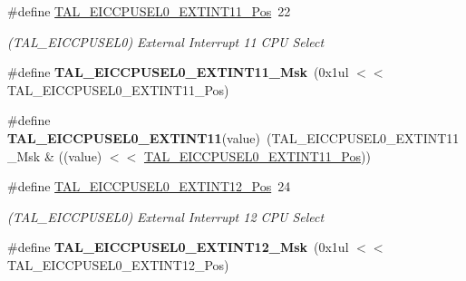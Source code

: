 \begin{DoxyCompactItemize}
\item 
\hypertarget{group___s_a_m_l21___t_a_l_ga1a308295007cbd0a12cda84afcc9bdfa}{}\#define \hyperlink{group___s_a_m_l21___t_a_l_ga1a308295007cbd0a12cda84afcc9bdfa}{T\+A\+L\+\_\+\+E\+I\+C\+C\+P\+U\+S\+E\+L0\+\_\+\+E\+X\+T\+I\+N\+T11\+\_\+\+Pos}~22\label{group___s_a_m_l21___t_a_l_ga1a308295007cbd0a12cda84afcc9bdfa}

\begin{DoxyCompactList}\small\item\em (T\+A\+L\+\_\+\+E\+I\+C\+C\+P\+U\+S\+E\+L0) External Interrupt 11 C\+P\+U Select \end{DoxyCompactList}\item 
\hypertarget{group___s_a_m_l21___t_a_l_ga5fe5659e7fb5db0aa3148a15c0838002}{}\#define {\bfseries T\+A\+L\+\_\+\+E\+I\+C\+C\+P\+U\+S\+E\+L0\+\_\+\+E\+X\+T\+I\+N\+T11\+\_\+\+Msk}~(0x1ul $<$$<$ T\+A\+L\+\_\+\+E\+I\+C\+C\+P\+U\+S\+E\+L0\+\_\+\+E\+X\+T\+I\+N\+T11\+\_\+\+Pos)\label{group___s_a_m_l21___t_a_l_ga5fe5659e7fb5db0aa3148a15c0838002}

\item 
\hypertarget{group___s_a_m_l21___t_a_l_ga52f5a93be9058a45eec060ce126e8168}{}\#define {\bfseries T\+A\+L\+\_\+\+E\+I\+C\+C\+P\+U\+S\+E\+L0\+\_\+\+E\+X\+T\+I\+N\+T11}(value)~(T\+A\+L\+\_\+\+E\+I\+C\+C\+P\+U\+S\+E\+L0\+\_\+\+E\+X\+T\+I\+N\+T11\+\_\+\+Msk \& ((value) $<$$<$ \hyperlink{group___s_a_m_l21___t_a_l_ga1a308295007cbd0a12cda84afcc9bdfa}{T\+A\+L\+\_\+\+E\+I\+C\+C\+P\+U\+S\+E\+L0\+\_\+\+E\+X\+T\+I\+N\+T11\+\_\+\+Pos}))\label{group___s_a_m_l21___t_a_l_ga52f5a93be9058a45eec060ce126e8168}

\item 
\hypertarget{group___s_a_m_l21___t_a_l_ga130a06cbbd3d3dcb5a643f0e5b0a8246}{}\#define \hyperlink{group___s_a_m_l21___t_a_l_ga130a06cbbd3d3dcb5a643f0e5b0a8246}{T\+A\+L\+\_\+\+E\+I\+C\+C\+P\+U\+S\+E\+L0\+\_\+\+E\+X\+T\+I\+N\+T12\+\_\+\+Pos}~24\label{group___s_a_m_l21___t_a_l_ga130a06cbbd3d3dcb5a643f0e5b0a8246}

\begin{DoxyCompactList}\small\item\em (T\+A\+L\+\_\+\+E\+I\+C\+C\+P\+U\+S\+E\+L0) External Interrupt 12 C\+P\+U Select \end{DoxyCompactList}\item 
\hypertarget{group___s_a_m_l21___t_a_l_ga9801e733d3d088b3d5533a7080b6be3d}{}\#define {\bfseries T\+A\+L\+\_\+\+E\+I\+C\+C\+P\+U\+S\+E\+L0\+\_\+\+E\+X\+T\+I\+N\+T12\+\_\+\+Msk}~(0x1ul $<$$<$ T\+A\+L\+\_\+\+E\+I\+C\+C\+P\+U\+S\+E\+L0\+\_\+\+E\+X\+T\+I\+N\+T12\+\_\+\+Pos)\label{group___s_a_m_l21___t_a_l_ga9801e733d3d088b3d5533a7080b6be3d}


\end{DoxyCompactItemize}
